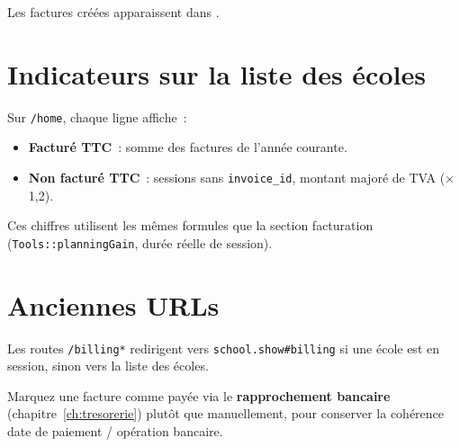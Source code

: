Les factures créées apparaissent dans .

\section{Indicateurs sur la liste des écoles}

Sur \texttt{/home}, chaque ligne affiche~:

\begin{itemize}[leftmargin=*]
  \item \textbf{Facturé TTC}~: somme des factures de l'année courante.
  \item \textbf{Non facturé TTC}~: sessions sans \texttt{invoice\_id}, montant majoré de TVA (×\,1{,}2).
\end{itemize}

Ces chiffres utilisent les mêmes formules que la section facturation (\texttt{Tools::planningGain}, durée réelle de session).

\section{Anciennes URLs}

Les routes \texttt{/billing*} redirigent vers \texttt{school.show\#billing} si une école est en session, sinon vers la liste des écoles.

\begin{astuce}
  Marquez une facture comme payée via le \textbf{rapprochement bancaire} (chapitre~\ref{ch:tresorerie}) plutôt que manuellement, pour conserver la cohérence date de paiement / opération bancaire.
\end{astuce}
